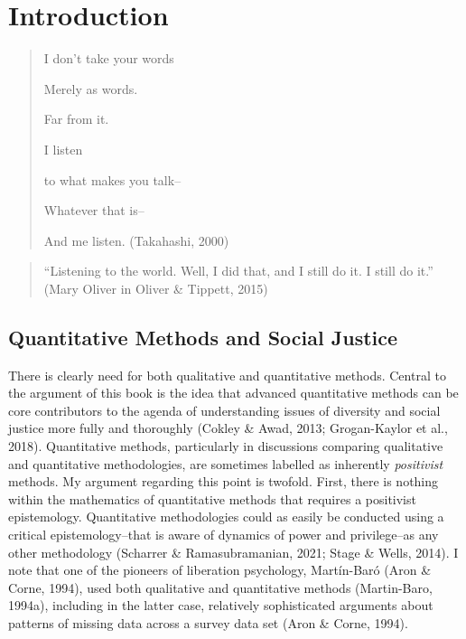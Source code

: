 \documentclass[
  letterpaper,
  DIV=11,
  numbers=noendperiod]{scrreprt}
\begin{document}
\chapter{Introduction}\label{introduction}

\begin{quote}
I don't take your words

Merely as words.

Far from it.

I listen

to what makes you talk--

Whatever that is--

And me listen. (Takahashi, 2000) 
\end{quote}

\begin{quote}
``Listening to the world. Well, I did that, and I still do it. I still
do it.'' (Mary Oliver in Oliver \& Tippett, 2015) 
\end{quote}

\section{Quantitative Methods and Social
Justice}\label{sec-socialjustice}

There is clearly need for both qualitative and quantitative methods.
 Central to the argument of
this book is the idea that advanced quantitative methods can be core
contributors to the agenda of understanding issues of diversity and
social justice more fully and thoroughly (Cokley \& Awad, 2013;
Grogan-Kaylor et al., 2018). Quantitative methods, particularly in
discussions comparing qualitative and quantitative methodologies, are
sometimes labelled as inherently \emph{positivist} methods.
 My argument regarding this point is twofold. First,
there is nothing within the mathematics of quantitative methods that
requires a positivist epistemology. Quantitative methodologies could as
easily be conducted using a critical epistemology--that is aware of
dynamics of power and privilege--as any other methodology (Scharrer \&
Ramasubramanian, 2021; Stage \& Wells, 2014).
  I note
that one of the pioneers of liberation psychology, Martín-Baró (Aron \&
Corne, 1994), used both qualitative and quantitative methods
(Martin-Baro, 1994a), including in the latter case, relatively
sophisticated arguments about patterns of missing data across a survey
data set (Aron \& Corne, 1994). 
\end{document}
